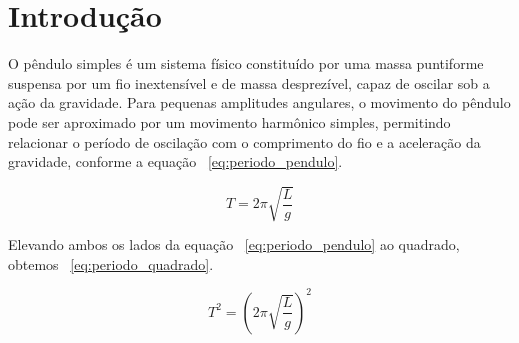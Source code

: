 \section*{Introdução}

O pêndulo simples é um sistema físico constituído por uma massa puntiforme suspensa por um fio inextensível e de massa desprezível, capaz de oscilar sob a ação da gravidade. Para pequenas amplitudes angulares, o movimento do pêndulo pode ser aproximado por um movimento harmônico simples, permitindo relacionar o período de oscilação com o comprimento do fio e a aceleração da gravidade, conforme a equação ~\eqref{eq:periodo_pendulo}.

\begin{equation}
T = 2\pi \sqrt{\frac{L}{g}}
\label{eq:periodo_pendulo}
\end{equation}

Elevando ambos os lados da equação ~\eqref{eq:periodo_pendulo} ao quadrado, obtemos ~\eqref{eq:periodo_quadrado}.

\begin{equation}
T^2 = \left(2\pi \sqrt{\frac{L}{g}}\right)^2
\label{eq:periodo_quadrado}
\end{equation}

